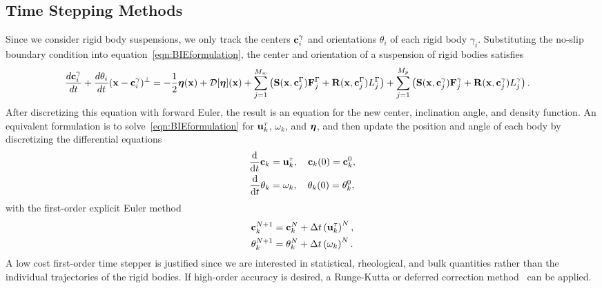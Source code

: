 \documentclass[AMA,STIX1COL]{WileyNJD-v2}
\begin{document}
\subsection{Time Stepping Methods}
\label{sec:temporal}
Since we consider rigid body suspensions, we only track the centers
${\mathbf{c}}_i^\gamma$ and orientations $\theta_i$ of each rigid body
$\gamma_i$.  Substituting the no-slip boundary condition into
equation~\eqref{eqn:BIEformulation}, the center and orientation of a
suspension of rigid bodies satisfies
\begin{align*}
  \frac{d{\mathbf{c}}_i^\gamma}{dt} + \frac{d\theta_i}{dt}
    ({\mathbf{x}} - {\mathbf{c}}_i^\gamma)^\perp &=
    -\frac{1}{2}{\boldsymbol\eta}({\mathbf{x}}) + {\mathcal{D}}[{\boldsymbol\eta}]({\mathbf{x}}) + 
    \sum_{j=1}^{M_w} \left(\mathbf{S}({\mathbf{x}},{\mathbf{c}}^\Gamma_j){\mathbf{F}}^\Gamma_j + 
      \mathbf{R}({\mathbf{x}},{\mathbf{c}}^\Gamma_j)L^\Gamma_j\right) 
    +\sum_{j=1}^{M_p} \left(\mathbf{S}({\mathbf{x}},{\mathbf{c}}^\gamma_j){\mathbf{F}}^\gamma_j +
      \mathbf{R}({\mathbf{x}},{\mathbf{c}}^\gamma_j)L^\gamma_j\right).
\end{align*}
After discretizing this equation with forward Euler, the result is an
equation for the new center, inclination angle, and density function.
An equivalent formulation is to solve~\eqref{eqn:BIEformulation} for
${\mathbf{u}}^\tau_k$, $\omega_k$, and ${\boldsymbol\eta}$, and then update the position and
angle of each body by discretizing the differential equations
\begin{align*}
  \frac{\text{d}}{\text{d}t}{\mathbf{c}}_k &= {\mathbf{u}}^\tau_k,  
    \quad {\mathbf{c}}_k(0) = {\mathbf{c}}_k^0, \\
  \frac{\text{d}}{\text{d}t}\theta_k &= \omega_k,
    \quad \theta_k(0) = \theta_k^0,
\end{align*}
with the first-order explicit Euler method
\begin{align*}
  {\mathbf{c}}_k^{N+1} &= {\mathbf{c}}_k^N + \Delta t \left({\mathbf{u}}_k^\tau\right)^N, \\
  \theta_k^{N+1} &= \theta_k^N + \Delta t \left(\omega_k\right)^N.
\end{align*}
A low cost first-order time stepper is justified since we are interested
in statistical, rheological, and bulk quantities rather than the
individual trajectories of the rigid bodies.  If high-order accuracy is
desired, a Runge-Kutta or deferred correction method~\cite{Quaife2015,
qua-bir2016} can be applied.
\end{document}
